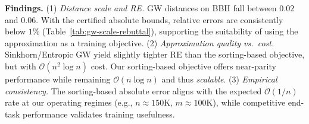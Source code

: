 \documentclass{article}
\begin{document}
\begin{table}[t]
\renewcommand\arraystretch{1.1}
\setlength{\tabcolsep}{4pt}
\centering
\large
{}
\vspace{0.5em}
\caption{Scale of GW distance and relative error on BBH subsets (14B model, $\sim$130K data).}
\label{tab:gw-scale-rebuttal}
\vspace{-2mm}
\end{table}

\textbf{Findings.}
(1) \textit{Distance scale and RE.} GW distances on BBH fall between $0.02$ and $0.06$.
With the certified absolute bounds, relative errors are consistently below $1\%$ (Table~\ref{tab:gw-scale-rebuttal}), supporting the suitability of using the approximation as a training objective. 
(2) \textit{Approximation quality vs.\ cost.} Sinkhorn/Entropic GW yield slightly tighter RE than the sorting-based objective, but with $\mathcal{O}(n^2\log n)$ cost.
Our sorting-based objective offers near-parity performance while remaining $\mathcal{O}(n\log n)$ and thus \emph{scalable}.
(3) \textit{Empirical consistency.} The sorting-based absolute error aligns with the expected $\mathcal{O}(1/n)$ rate at our operating regimes (e.g., $n\!\approx\!150$K, $m\!\approx\!100$K), while competitive end-task performance validates training usefulness.
\end{document}
